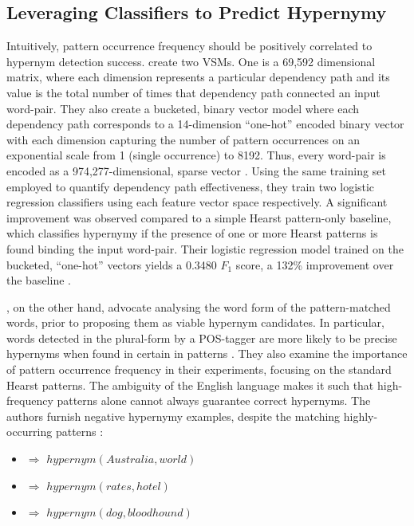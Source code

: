 \subsection{Leveraging Classifiers to Predict Hypernymy}
Intuitively, pattern occurrence frequency should be positively correlated to hypernym detection success.  \citeauthor{Snow2004} create two \ac{VSM}s.  One is a 69,592 dimensional matrix, where each dimension represents a particular dependency path and its value is the total number of times that dependency path connected an input word-pair.  They also create a bucketed, binary vector model where each dependency path corresponds to a 14-dimension ``one-hot'' encoded binary vector with each dimension capturing the number of pattern occurrences on an exponential scale from 1 (single occurrence) to 8192.  Thus, every word-pair is encoded as a 974,277-dimensional, sparse vector \citep{Snow2004}.  Using the same training set employed to quantify dependency path effectiveness, they train two logistic regression classifiers using each feature vector space respectively.  A significant improvement was observed compared to a simple Hearst pattern-only baseline, which classifies hypernymy if the presence of one or more Hearst patterns is found binding the input word-pair.  Their logistic regression model trained on the bucketed, “one-hot” vectors yields a 0.3480 $F_1$ score, a 132\% improvement over the baseline \citep{Snow2004}. 

\citet{ritter2009anyway}, on the other hand, advocate analysing the word form of the pattern-matched words, prior to proposing them as viable hypernym candidates.  In particular, words detected in the plural-form by a POS-tagger are more likely to be precise hypernyms when found in certain in patterns \citep{ritter2009anyway}.  They also examine the importance of pattern occurrence frequency in their experiments, focusing on the standard Hearst patterns.  The ambiguity of the English language makes it such that high-frequency patterns alone cannot always guarantee correct hypernyms.  The authors furnish negative hypernymy examples, despite the matching highly-occurring patterns \citep{ritter2009anyway}:
\begin{itemize}
    \item {} $\Rightarrow$ $hypernym(Australia, world)$
    \item {} $\Rightarrow$ $hypernym(rates, hotel)$
    \item {} $\Rightarrow$ $hypernym(dog, bloodhound)$
\end{itemize}


